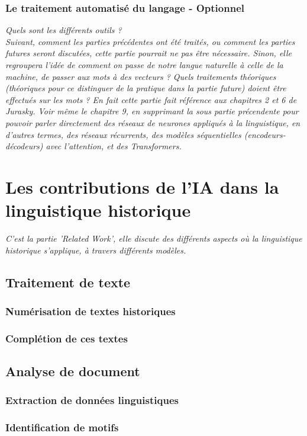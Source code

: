 \documentclass[12pt, letterpaper]{report}
\begin{document}
\subsection{Le traitement automatisé du langage - Optionnel}
\textit{Quels sont les différents outils ?}\\
\textit{Suivant, comment les parties précédentes ont été traités, ou comment les parties futures seront discutées, cette partie pourrait ne pas être nécessaire. Sinon, elle regroupera l'idée de comment on passe de notre langue naturelle à celle de la machine, de passer aux mots à des vecteurs ? Quels traitements théoriques (théoriques pour ce distinguer de la pratique dans la partie future) doient être effectués sur les mots ? En fait cette partie fait référence aux chapitres 2 et 6 de Jurasky. Voir même le chapitre 9, en supprimant la sous partie précendente pour pouvoir parler directement des réseaux de neurones appliqués à la linguistique, en d'autres termes, des réseaux récurrents, des modèles séquentielles (encodeurs-décodeurs) avec l'attention, et des Transformers.}

\chapter{Les contributions de l'IA dans la linguistique historique}
\textit{C'est la partie 'Related Work', elle discute des différents aspects où la linguistique historique s'applique, à travers différents modèles.}
\section{Traitement de texte}
\subsection{Numérisation de textes historiques}
\subsection{Complétion de ces textes}
\section{Analyse de document}
\subsection{Extraction de données linguistiques}
\subsection{Identification de motifs}
\end{document}
